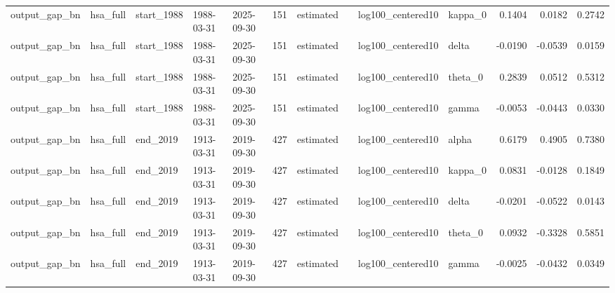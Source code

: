 \begin{tabular}{lllllrllllrrr}
output\_gap\_bn & hsa\_full & start\_1988 & 1988-03-31 & 2025-09-30 & 151 & estimated &  & log100\_centered10 & kappa\_0 & 0.1404 & 0.0182 & 0.2742 \\
output\_gap\_bn & hsa\_full & start\_1988 & 1988-03-31 & 2025-09-30 & 151 & estimated &  & log100\_centered10 & delta & -0.0190 & -0.0539 & 0.0159 \\
output\_gap\_bn & hsa\_full & start\_1988 & 1988-03-31 & 2025-09-30 & 151 & estimated &  & log100\_centered10 & theta\_0 & 0.2839 & 0.0512 & 0.5312 \\
output\_gap\_bn & hsa\_full & start\_1988 & 1988-03-31 & 2025-09-30 & 151 & estimated &  & log100\_centered10 & gamma & -0.0053 & -0.0443 & 0.0330 \\
output\_gap\_bn & hsa\_full & end\_2019 & 1913-03-31 & 2019-09-30 & 427 & estimated &  & log100\_centered10 & alpha & 0.6179 & 0.4905 & 0.7380 \\
output\_gap\_bn & hsa\_full & end\_2019 & 1913-03-31 & 2019-09-30 & 427 & estimated &  & log100\_centered10 & kappa\_0 & 0.0831 & -0.0128 & 0.1849 \\
output\_gap\_bn & hsa\_full & end\_2019 & 1913-03-31 & 2019-09-30 & 427 & estimated &  & log100\_centered10 & delta & -0.0201 & -0.0522 & 0.0143 \\
output\_gap\_bn & hsa\_full & end\_2019 & 1913-03-31 & 2019-09-30 & 427 & estimated &  & log100\_centered10 & theta\_0 & 0.0932 & -0.3328 & 0.5851 \\
output\_gap\_bn & hsa\_full & end\_2019 & 1913-03-31 & 2019-09-30 & 427 & estimated &  & log100\_centered10 & gamma & -0.0025 & -0.0432 & 0.0349 \\
\bottomrule
\end{tabular}
